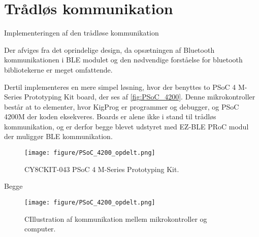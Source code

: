 \section{Trådløs kommunikation}
Implementeringen af den trådløse kommunikation 

Der afviges fra det oprindelige design, da opsætningen af Bluetooth kommunikationen i BLE modulet og den nødvendige forståelse for bluetooth bibliotekerne er meget omfattende. 


Dertil implementeres en mere simpel løsning, hvor der benyttes to PSoC 4 M-Series Prototyping Kit board, der ses af \autoref{fig:PSoC_4200}. Denne mikrokontroller består at to elementer, hvor KigProg er programmer og debugger, og PSoC 4200M der koden eksekveres. 
Boards er alene ikke i stand til trådløs kommunikation, og er derfor begge blevet udstyret med EZ-BLE PRoC modul der muliggør BLE kommunikation.

\begin{figure}[H]
	\centering
	\texttt{[image: figure/PSoC\_4200\_opdelt.png]}
	\caption{CY8CKIT-043 PSoC 4 M-Series Prototyping Kit\citep{cypress42015}.}
	\label{fig:PSoC_4200}
\end{figure}

Begge 





\begin{figure}[H]
	\centering
	\texttt{[image: figure/PSoC\_4200\_opdelt.png]}
	\caption{CIllustration af kommunikation mellem mikrokontroller og computer.}
	\label{fig:PSoC_4200}
\end{figure}